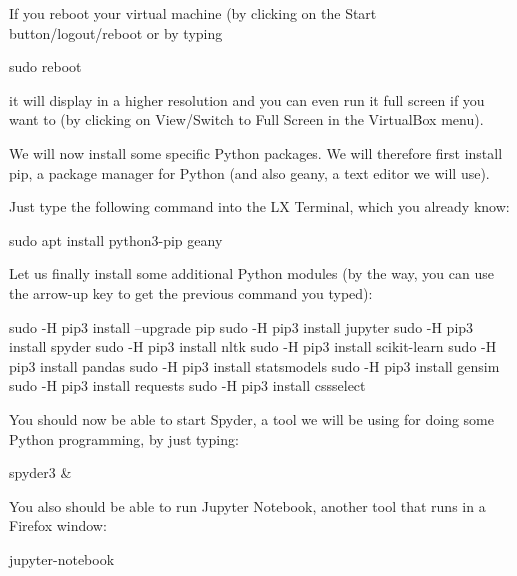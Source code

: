 \documentclass[a4paper,12pt]{book}
\begin{document}
If you reboot your virtual machine (by clicking on the Start button/logout/reboot or by typing
\begin{lstlistingbash}
sudo reboot
\end{lstlistingbash}
it will display in a higher resolution and you can even run it full screen if you want to (by clicking on View/Switch to Full Screen in the VirtualBox menu).

We will now install some specific Python packages. We will therefore first install pip, a package manager for Python (and also geany, a text editor we will use). 

Just type the following command into the LX Terminal, which you already know:

\begin{lstlistingbash}
sudo apt install python3-pip geany
\end{lstlistingbash}

Let us finally install some additional Python modules (by the way, you can use the arrow-up key to get the previous command you typed):

\begin{lstlistingbash}
sudo -H pip3 install --upgrade pip
sudo -H pip3 install jupyter
sudo -H pip3 install spyder
sudo -H pip3 install nltk
sudo -H pip3 install scikit-learn
sudo -H pip3 install pandas
sudo -H pip3 install statsmodels
sudo -H pip3 install gensim
sudo -H pip3 install requests
sudo -H pip3 install cssselect
\end{lstlistingbash}

You should now be able to start Spyder, a tool we will be using for doing some Python programming, by just typing:

\begin{lstlistingbash}
spyder3 &
\end{lstlistingbash}


You also should be able to run Jupyter Notebook, another tool that runs in a Firefox window:


\begin{lstlistingbash}
jupyter-notebook
\end{lstlistingbash}
\end{document}
